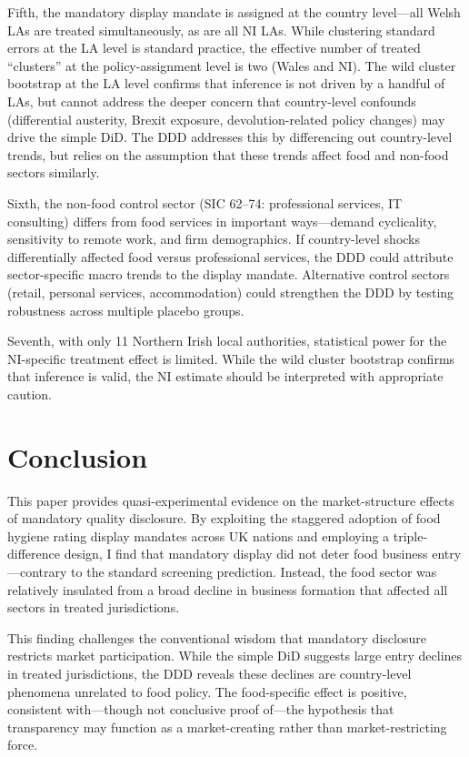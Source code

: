 \documentclass[12pt]{article}
\begin{document}
Fifth, the mandatory display mandate is assigned at the country level---all Welsh LAs are treated simultaneously, as are all NI LAs. While clustering standard errors at the LA level is standard practice, the effective number of treated ``clusters'' at the policy-assignment level is two (Wales and NI). The wild cluster bootstrap at the LA level confirms that inference is not driven by a handful of LAs, but cannot address the deeper concern that country-level confounds (differential austerity, Brexit exposure, devolution-related policy changes) may drive the simple DiD. The DDD addresses this by differencing out country-level trends, but relies on the assumption that these trends affect food and non-food sectors similarly.

Sixth, the non-food control sector (SIC 62--74: professional services, IT consulting) differs from food services in important ways---demand cyclicality, sensitivity to remote work, and firm demographics. If country-level shocks differentially affected food versus professional services, the DDD could attribute sector-specific macro trends to the display mandate. Alternative control sectors (retail, personal services, accommodation) could strengthen the DDD by testing robustness across multiple placebo groups.

Seventh, with only 11 Northern Irish local authorities, statistical power for the NI-specific treatment effect is limited. While the wild cluster bootstrap confirms that inference is valid, the NI estimate should be interpreted with appropriate caution.


\section{Conclusion}
\label{sec:conclusion}

This paper provides quasi-experimental evidence on the market-structure effects of mandatory quality disclosure. By exploiting the staggered adoption of food hygiene rating display mandates across UK nations and employing a triple-difference design, I find that mandatory display did not deter food business entry---contrary to the standard screening prediction. Instead, the food sector was relatively insulated from a broad decline in business formation that affected all sectors in treated jurisdictions.

This finding challenges the conventional wisdom that mandatory disclosure restricts market participation. While the simple DiD suggests large entry declines in treated jurisdictions, the DDD reveals these declines are country-level phenomena unrelated to food policy. The food-specific effect is positive, consistent with---though not conclusive proof of---the hypothesis that transparency may function as a market-creating rather than market-restricting force.
\end{document}
